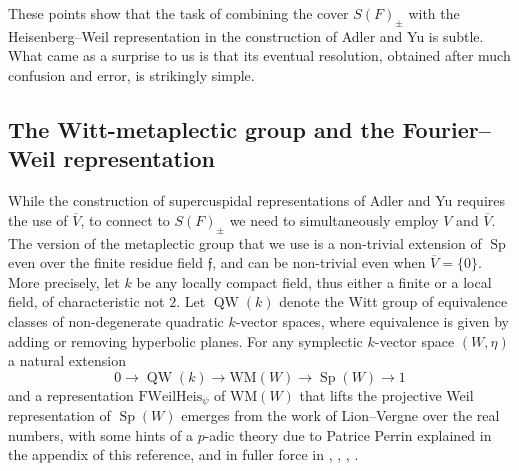 \documentclass{article}
\def\ol#1{\overline{#1}}
\DeclareMathOperator{\Sp}{Sp}
\theoremstyle{definition}
\numberwithin{equation}{subsection}
\renewcommand{\-}{\hyp{}}
\newcommand{\WMuniv}{\mathrm{WM}}
\DeclareMathOperator{\QW}{QW}
\newcommand{\rf}{\mathfrak{f}}
\newcommand{\oV}{\ol{V}}
\begin{document}
These points show that the task of combining the cover $S(F)_\pm$ with the Heisenberg--Weil representation in the construction of Adler and Yu is subtle. What came as a surprise to us is that its eventual resolution, obtained after much confusion and error, is strikingly simple.

\subsection{The Witt-metaplectic group and the Fourier--Weil representation}

While the construction of supercuspidal representations of Adler and Yu requires the use of $\oV$, to connect to $S(F)_\pm$ we need to simultaneously employ $V$ and $\oV$. The version of the metaplectic group that we use is a non-trivial extension of $\Sp$ even over the finite residue field $\rf$, and can be non-trivial even when $\oV=\{0\}$. More precisely, let $k$ be any locally compact field, thus either a finite or a local field,  of characteristic not $2$. Let $\QW(k)$ denote the Witt group of equivalence classes of non-degenerate quadratic $k$-vector spaces, where equivalence is given by adding or removing hyperbolic planes. For any symplectic $k$-vector space $(W,\eta)$ a natural extension
\[ 0 \to \QW(k) \to \WMuniv(W) \to \Sp(W) \to 1 \]
and a representation $\mathrm{FWeilHeis}_\psi$ of $\WMuniv(W)$ that lifts the projective Weil representation of $\Sp(W)$ emerges from the work \cite{LionVergne} of Lion--Vergne over the real numbers, with some hints of a $p$-adic theory due to Patrice Perrin explained in the appendix of this reference, and in fuller force in \cite{RR93}, \cite{Thomas2006}, \cite{Thomas2008}, \cite{Thomas2013}.
\end{document}
